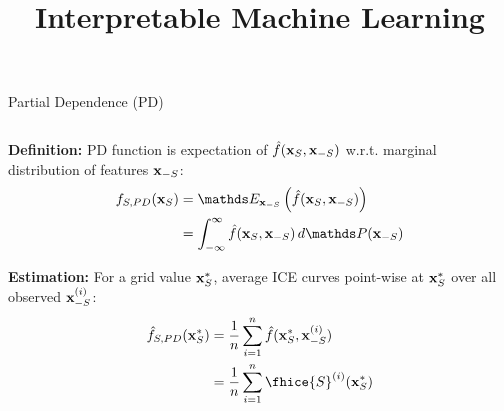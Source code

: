 \documentclass[10pt,compress,t,notes=noshow, xcolor=table]{beamer}
\title{Interpretable Machine Learning}
\date{}
\begin{document}


\begin{frame}{Partial Dependence (PD) }

\begin{columns}[T, totalwidth=\textwidth]
\begin{column}{0.55\textwidth}
\textbf{Definition:} PD function is expectation of $\hat{f}(\mathbf{x}_S, \mathbf{x}_{-S})$ w.r.t. marginal distribution of features $\mathbf{x}_{-S}$:
\begin{align*}
    f_{S, PD}(\xv_S) &= \E_{\xv_{-S}} \left( \fh(\xv_S, \xv_{-S}) \right) \\
    &= \int_{-\infty}^{\infty} \fh(\xv_S, \xv_{-S}) \, d\P(\xv_{-S})
\end{align*}

\medskip

\textbf{Estimation:} For a grid value $\mathbf{x}_S^*$, average ICE curves point-wise at $\mathbf{x}_S^*$ over all observed $\mathbf{x}_{-S}^{(i)}$:
\begin{align*}
    \fh_{S, PD}(\xv_S^*) &= \frac{1}{n} \sum_{i=1}^n \fh(\xv_S^*, \xv_{-S}^{(i)})   \\
    &= \frac{1}{n} \sum_{i=1}^n \fhice{S}^{(i)}(\xv_S^*) 
\end{align*}

\end{column}


\end{columns}
\end{frame}
\end{document}
